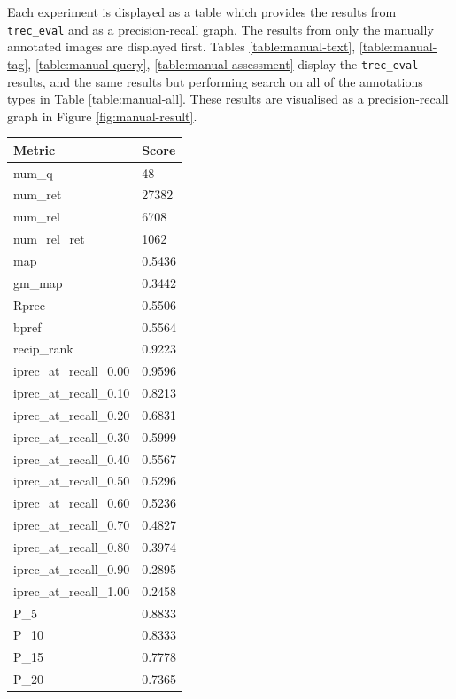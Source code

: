 Each experiment is displayed as a table which provides the results from \verb|trec_eval| and as a precision-recall graph. The results from only the manually annotated images are displayed first. Tables \ref{table:manual-text},  \ref{table:manual-tag}, \ref{table:manual-query}, \ref{table:manual-assessment} display the \verb|trec_eval| results, and the same results but performing search on all of the annotations types in Table \ref{table:manual-all}. These results are visualised as a precision-recall graph in Figure \ref{fig:manual-result}.

\begin{table}[htb]
    \parbox{.45\linewidth}{
    \begin{tabular}{ | l | l | }
    \hline
    Metric & Score \\ \hline
	num\_q & 48 \\ \hline
	num\_ret & 27382 \\ \hline
	num\_rel & 6708 \\ \hline
	num\_rel\_ret & 1062 \\ \hline
	map & 0.5436 \\ \hline
	gm\_map & 0.3442 \\ \hline
	Rprec & 0.5506 \\ \hline
	bpref & 0.5564 \\ \hline
	recip\_rank & 0.9223 \\ \hline
	iprec\_at\_recall\_0.00 & 0.9596 \\ \hline
	iprec\_at\_recall\_0.10 & 0.8213 \\ \hline
	iprec\_at\_recall\_0.20 & 0.6831 \\ \hline
	iprec\_at\_recall\_0.30 & 0.5999 \\ \hline
	iprec\_at\_recall\_0.40 & 0.5567 \\ \hline
	iprec\_at\_recall\_0.50 & 0.5296 \\ \hline
	iprec\_at\_recall\_0.60 & 0.5236 \\ \hline
	iprec\_at\_recall\_0.70 & 0.4827 \\ \hline
	iprec\_at\_recall\_0.80 & 0.3974 \\ \hline
	iprec\_at\_recall\_0.90 & 0.2895 \\ \hline
	iprec\_at\_recall\_1.00 & 0.2458 \\ \hline
	P\_5 & 0.8833 \\ \hline
	P\_10 & 0.8333 \\ \hline
	P\_15 & 0.7778 \\ \hline
	P\_20 & 0.7365 \\ \hline

\end{tabular}}
\end{table}
